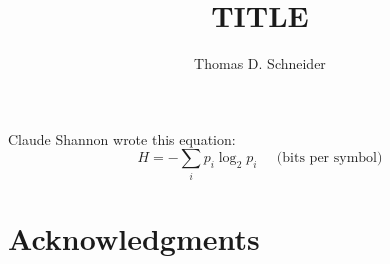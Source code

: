 \documentclass[12pt]{article}
\title{TITLE}
\author{
Thomas D. Schneider
}
\date{\theversion}
\newenvironment{DIFnomarkup}{}{}
\begin{document}
\maketitle

Claude Shannon wrote this equation:
%
\begin{equation}
H = - \sum_{i} p_i \log_2 p_i
\;\;\;\;\;\mbox{(bits per symbol)}
\label{eqn.H}
\end{equation}

\section{Acknowledgments}
\end{document}

